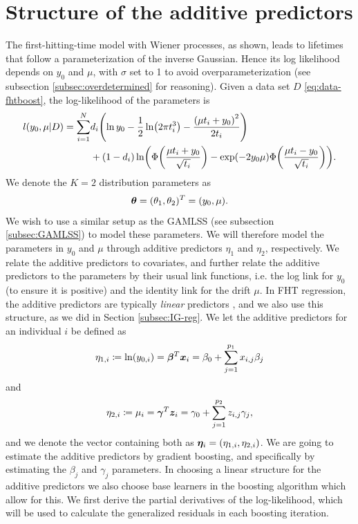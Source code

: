 \section{Structure of the additive predictors}
The first-hitting-time model with Wiener processes, as shown, leads to lifetimes that follow a parameterization of the inverse Gaussian.
Hence its log likelihood depends on $y_0$ and $\mu$, with $\sigma$ set to 1 to avoid overparameterization (see subsection \ref{subsec:overdetermined} for reasoning).
Given a data set $D$ \eqref{eq:data-fhtboost}, the log-likelihood of the parameters is
\begin{align*}
\begin{split}
    l(y_0,\mu|D)=\sum_{i=1}^N&d_i\p*{\ln y_0-\frac{1}{2}\ln\p*{2\pi\ti^3}-\frac{\p*{\mu\ti+y_0}^2}{2\ti}} \\
    &+
    (1-d_i)\ln\p*{\Phi\p*{\frac{\mu\ti+y_0}{\sqrt{\ti}}}-\exp\p*{-2y_0\mu}\Phi\p*{\frac{\mu\ti-y_0}{\sqrt{\ti}}}}.
\end{split}
\end{align*}
We denote the $K=2$ distribution parameters as
\begin{equation*}
    \boldsymbol{\theta}=(\theta_1,\theta_2)^T=(y_0,\mu).
\end{equation*}
We wish to use a similar setup as the GAMLSS (see subsection \ref{subsec:GAMLSS}) to model these parameters.
We will therefore model the parameters in $y_0$ and $\mu$ through additive predictors $\eta_1$ and $\eta_2$, respectively.
We relate the additive predictors to covariates, and further relate the additive predictors to the parameters by their usual link functions, i.e. the log link for $y_0$ (to ensure it is positive) and the identity link for the drift $\mu$.
In FHT regression, the additive predictors are typically \textit{linear} predictors \citep{leewhitmore2006}, and we also use this structure, as we did in Section \ref{subsec:IG-reg}.
We let the additive predictors for an individual $i$ be defined as
\begin{equation}\label{eq:eta1}
    \eta_{1,i}\coloneqq \ln(y_{0,i})=\boldsymbol{\beta}^T \bm{x}_i=\beta_{0}+\sum_{j=1}^{p_1}x_{i,j}\beta_j
\end{equation}
and
\begin{equation}\label{eq:eta2}
    \eta_{2,i}\coloneqq \mu_{i}=\boldsymbol{\gamma}^T \bm{z}_i=\gamma_{0}+\sum_{j=1}^{p_2}z_{i,j}\gamma_j,
\end{equation}
and we denote the vector containing both as $\boldsymbol{\eta}_i=\left(\eta_{1,i},\eta_{2,i}\right)$.
We are going to estimate the additive predictors by gradient boosting, and specifically by estimating the $\beta_j$ and $\gamma_j$ parameters.
In choosing a linear structure for the additive predictors we also choose base learners in the boosting algorithm which allow for this.
We first derive the partial derivatives of the log-likelihood, which will be used to calculate the generalized residuals in each boosting iteration.

